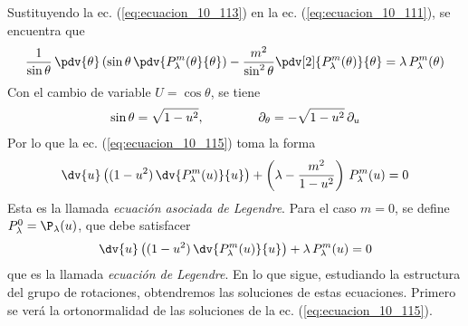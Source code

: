 Sustituyendo la ec. (\ref{eq:ecuacion_10_113}) en la ec. (\ref{eq:ecuacion_10_111}), se encuentra que
\begin{align}
\dfrac{1}{\sin \theta} \, \pdv{\theta} \left( \sin \theta \, \pdv{P_{\lambda}^{m} (\theta}{\theta} \right) - \dfrac{m^{2}}{\sin^{2} \theta} \pdv[2]{P_{\lambda}^{m} (\theta)}{\theta} = \lambda \, P_{\lambda}^{m} (\theta) \label{eq:ecuacion_10_115}
\end{align}
Con el cambio de variable $U = \cos \theta$, se tiene
\begin{align}
\sin \theta = \sqrt{1 - u^{2}}, \hspace{1.5cm} \partial_{\theta} = - \sqrt{1 - u^{2}} \, \partial_{u}
\label{eq:ecuacion_10_116}
\end{align}
Por lo que la ec. (\ref{eq:ecuacion_10_115}) toma la forma
\begin{align}
\dv{u} \left( (1 - u^{2}) \, \dv{P_{\lambda}^{m} (u)}{u} \right) + \left( \lambda - \dfrac{m^{2}}{1 - u^{2}} \right) \, P_{\lambda}^{m} (u) = 0
\label{eq:ecuacion_10_117}
\end{align}
Esta es la llamada \emph{ecuación asociada de Legendre}.
 Para el caso $m = 0$, se define $P_{\lambda}^{0} = \P_{\lambda} (u)$, que debe satisfacer
 \begin{align}
\dv{u} \left( (1 - u^{2}) \, \dv{P_{\lambda}^{m} (u)}{u} \right) + \lambda \, P_{\lambda}^{m} (u) = 0
\label{eq:ecuacion_10_118}
\end{align}
que es la llamada \emph{ecuación de Legendre}. En lo que sigue, estudiando la estructura del grupo de rotaciones, obtendremos las soluciones de estas ecuaciones. Primero se verá la ortonormalidad de las soluciones de la ec. (\ref{eq:ecuacion_10_115}).
